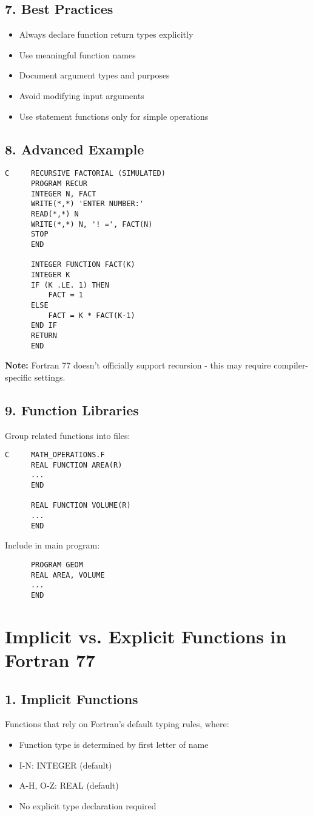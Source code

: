 \documentclass{book}
\begin{document}
\subsection*{7. Best Practices}
\begin{itemize}
\item Always declare function return types explicitly
\item Use meaningful function names
\item Document argument types and purposes
\item Avoid modifying input arguments
\item Use statement functions only for simple operations
\end{itemize}

\subsection*{8. Advanced Example}
\begin{verbatim}
C     RECURSIVE FACTORIAL (SIMULATED)
      PROGRAM RECUR
      INTEGER N, FACT
      WRITE(*,*) 'ENTER NUMBER:'
      READ(*,*) N
      WRITE(*,*) N, '! =', FACT(N)
      STOP
      END

      INTEGER FUNCTION FACT(K)
      INTEGER K
      IF (K .LE. 1) THEN
          FACT = 1
      ELSE
          FACT = K * FACT(K-1)
      END IF
      RETURN
      END
\end{verbatim}
\textbf{Note:} Fortran 77 doesn't officially support recursion - this may require compiler-specific settings.

\subsection*{9. Function Libraries}
Group related functions into files:
\begin{verbatim}
C     MATH_OPERATIONS.F
      REAL FUNCTION AREA(R)
      ...
      END

      REAL FUNCTION VOLUME(R)
      ...
      END
\end{verbatim}
Include in main program:
\begin{verbatim}
      PROGRAM GEOM
      REAL AREA, VOLUME
      ...
      END
\end{verbatim}
\section{Implicit vs. Explicit Functions in Fortran 77}

\subsection*{1. Implicit Functions}
Functions that rely on Fortran's default typing rules, where:
\begin{itemize}
\item Function type is determined by first letter of name
\item I-N: INTEGER (default)
\item A-H, O-Z: REAL (default)
\item No explicit type declaration required
\end{itemize}
\end{document}
